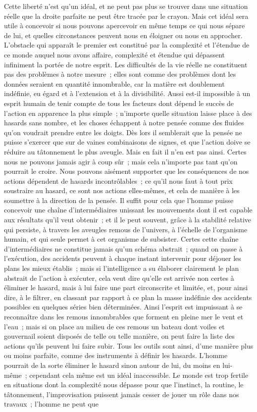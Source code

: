\documentclass[french,twoside]{book} %
\begin{document}
Cette liberté n'est qu'un idéal, et ne peut pas plus se trouver dans une situation réelle que la droite parfaite ne peut être tracée par le crayon. Mais cet idéal sera utile à concevoir si nous pouvons apercevoir en même temps ce qui nous sépare de lui, et quelles circonstances peuvent nous en éloigner ou nous en approcher. L'obstacle qui apparaît le premier est constitué par la complexité et l'étendue de ce monde auquel nous avons affaire, complexité et étendue qui dépassent infiniment la portée de notre esprit. Les difficultés de la vie réelle ne constituent pas des problèmes à notre mesure ; elles sont comme des problèmes dont les données seraient en quantité innombrable, car la matière est doublement indéfinie, eu égard et à l'extension et à la divisibilité. Aussi est-il impossible à un esprit humain de tenir compte de tous les facteurs dont dépend le succès de l'action en apparence la plus simple ; n'importe quelle situation laisse place à des hasards sans nombre, et les choses échappent à notre pensée comme des fluides qu'on voudrait prendre entre les doigts. Dès lors il semblerait que la pensée ne puisse s'exercer que sur de vaines combinaisons de signes, et que l'action doive se réduire au tâtonnement le plus aveugle. Mais en fait il n'en est pas ainsi. Certes nous ne pouvons jamais agir à coup sûr ; mais cela n'importe pas tant qu'on pourrait le croire. Nous pouvons aisément supporter que les conséquences de nos actions dépendent de hasards incontrôlables ; ce qu'il nous faut à tout prix soustraire au hasard, ce sont nos actions elles-mêmes, et cela de manière à les soumettre à la direction de la pensée. Il suffit pour cela que l'homme puisse concevoir une chaîne d'intermédiaires unissant les mouvements dont il est capable aux résultats qu'il veut obtenir ; et il le peut souvent, grâce à la stabilité relative qui persiste, à travers les aveugles remous de l'univers, à l'échelle de l'organisme humain, et qui seule permet à cet organisme de subsister. Certes cette chaîne d'intermédiaires ne constitue jamais qu'un schéma abstrait ; quand on passe à l'exécution, des accidents peuvent à chaque instant intervenir pour déjouer les plans les mieux établis ; mais si l'intelligence a su élaborer clairement le plan abstrait de l'action à exécuter, cela veut dire qu'elle est arrivée non certes à éliminer le hasard, mais à lui faire une part circonscrite et limitée, et, pour ainsi dire, à le filtrer, en classant par rapport à ce plan la masse indéfinie des accidents possibles en quelques séries bien déterminées. Ainsi l'esprit est impuissant à se reconnaître dans les remous innombrables que forment en pleine mer le vent et l'eau ; mais si on place au milieu de ces remous un bateau dont voiles et gouvernail soient disposés de telle ou telle manière, on peut faire la liste des actions qu'ils peuvent lui faire subir. Tous les outils sont ainsi, d'une manière plus ou moins parfaite, comme des instruments à définir les hasards. L'homme pourrait de la sorte éliminer le hasard sinon autour de lui, du moins en lui-même ; cependant cela même est un idéal inaccessible. Le monde est trop fertile en situations dont la complexité nous dépasse pour que l'instinct, la routine, le tâtonnement, l'improvisation puissent jamais cesser de jouer un rôle dans nos travaux ; l'homme ne peut que 
\end{document}
